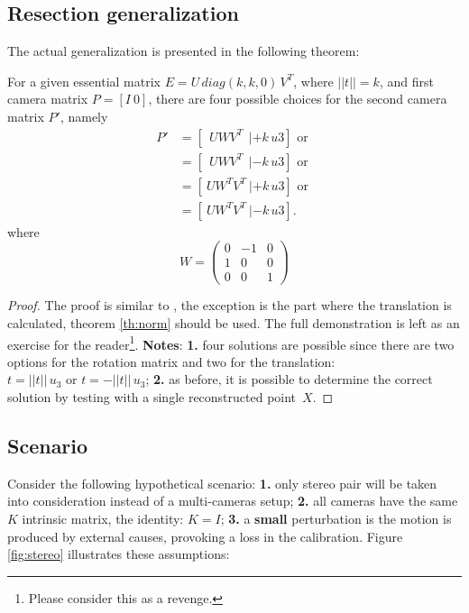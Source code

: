 \subsection{Resection generalization}
The actual generalization is presented in the following theorem:
\begin{theorem}
\label{th:generalization}
For a given essential matrix $E = U\,diag(k,k,0)\,V^T$, where $||t||=k$, and first camera matrix
$P = [I~0]$, there are four possible choices for the second camera matrix $P'$, namely
\begin{align*}
P' & = [~~UWV^T ~ ~| +k\,u3] \mbox{~or~} \\
   & = [~~UWV^T ~ ~| -k\,u3] \mbox{~or~} \\
   & = [~UW^TV^T ~ | +k\,u3] \mbox{~or~} \\
   & = [~UW^TV^T ~ | -k\,u3 ].
\end{align*}
where
\begin{equation}
\label{eq:W}
W =
\begin{pmatrix}
  0 & -1  & 0 \\
  1 &  0  & 0 \\
  0 &  0  & 1
\end{pmatrix}
\end{equation}
\end{theorem}

\begin{proof}
The proof is similar to \cite[Result 9.18 and Result 9.19]{HZ2}, the exception is the part where the translation is calculated, theorem \ref{th:norm} should be used. The full demonstration is left as an exercise for the reader\footnote{Please consider this as a revenge.}. \textbf{Notes}: \textbf{1.} four solutions are possible since there are two options for the rotation matrix and two for the translation: $t = ||t||\,u_3 \mbox{~or~} t=-||t||\,u_3$; \textbf{2.} as before, it is possible to determine the correct solution by testing with a single reconstructed point~$X$.
\end{proof}



\subsection{Scenario}

Consider the following hypothetical scenario: \textbf{1.} only stereo pair will be taken into consideration instead of a multi-cameras setup; \textbf{2.} all cameras have the same $K$ intrinsic matrix, the identity: $K = I$; \textbf{3.} a \textbf{small} perturbation is the motion is produced by external causes, provoking a loss in the calibration. Figure \ref{fig:stereo} illustrates these assumptions:

